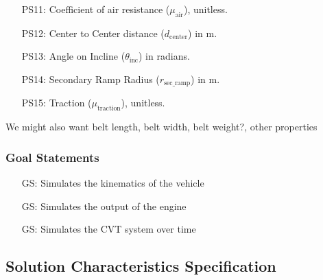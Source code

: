 \documentclass[12pt]{article}
\newcounter{goalnum} %
\begin{document}
\begin{itemize}
\item[PS11:] Coefficient of air resistance ($\mu_{\text{air}}$), unitless.

\item[PS12:] Center to Center distance ($d_{\text{center}}$) in m.

\item[PS13:] Angle on Incline ($\theta_{\text{inc}}$) in radians.

\item[PS14:] Secondary Ramp Radius ($r_{\text{sec\_ramp}}$) in m.

\item[PS15:] Traction ($\mu_{\text{traction}}$), unitless.

\end{itemize}
We might also want belt length, belt width, belt weight?, other properties

\subsubsection{Goal Statements}

\begin{itemize}

\item[GS\refstepcounter{goalnum}\thegoalnum \label{GS1}:]  Simulates the kinematics of the vehicle
\item[GS\refstepcounter{goalnum}\thegoalnum \label{GS2}:]  Simulates the output of the engine
\item[GS\refstepcounter{goalnum}\thegoalnum \label{GS3}:]  Simulates the CVT system over time

\end{itemize}

\subsection{Solution Characteristics Specification}

\end{document}
